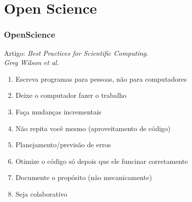 \section{Open Science}


\begin{frame}
  \frametitle{OpenScience}
  Artigo: \textit{Best Practices for Scientific Computing}. \\
          \textit{Greg Wilson et al.}
  \begin{enumerate}
    \item Escreva programas para pessoas, não para computadores
    \item Deixe o computador fazer o trabalho
    \item Faça mudanças incrementais
    \item Não repita você mesmo (aproveitamento de código)
    \item Planejamento/previsão de erros 
    \item Otimize o código só depois que ele funcinar corretamente
    \item Documente o propósito (não mecanicamente)
    \item Seja colaborativo
  \end{enumerate}
\end{frame}
